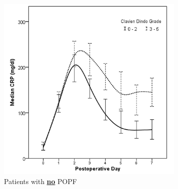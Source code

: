 \clearpage
\begin{figure}[t]
	\caption{Relationship between postoperative CRP and clinically significant infective complications in patients without (A) and with (B) POPF.}
	\label{fig:crp_comp_infective_leak}
	\centering
	\begin{subfigure}{0.48\textwidth}
		\centering
		\includegraphics[width=\textwidth]{Figures/crp_comp_infective_leak0}
		\caption{Patients with \textbf{\underline{no}} POPF}
		\label{fig:crp_comp_infective_leak0}
	\end{subfigure}
	\hfill
	\begin{subfigure}{0.48\textwidth}
		\centering

\end{subfigure}
\end{figure}
